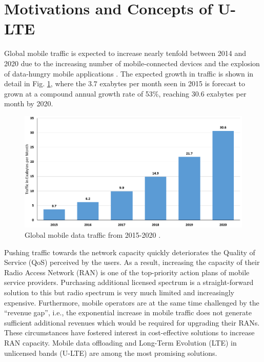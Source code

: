 \section{Motivations and Concepts of U-LTE}
\label{lte-motiv}

Global mobile traffic is expected to increase nearly tenfold between 2014 and 2020 due to the increasing number of mobile-connected devices and the explosion of data-hungry mobile applications \cite{cisco_mobile_traffic_2015}. The expected growth in traffic is shown in detail in Fig. \ref{figs:global-mobile-data-traffic-2015-2020}, where the $3.7$ exabytes per month seen in 2015 is forecast to grown at a compound annual growth rate of 53\%, reaching $30.6$ exabytes per month by 2020. 
\begin{figure}[!ht]
	\centering
	\includegraphics[width=\textwidth]{figs/global-mobile-data-traffic-2015-2020}
	\caption{Global mobile data traffic from 2015-2020 \cite{cisco_mobile_traffic_2015}.}
	\label{figs:global-mobile-data-traffic-2015-2020}
\end{figure}
Pushing traffic towards the network capacity quickly deteriorates the Quality of Service (QoS) perceived by the users. As a result, increasing the capacity of their Radio Access Network (RAN) is one of the top-priority action plans of mobile service providers. Purchasing additional licensed spectrum is a straight-forward solution to this but radio spectrum is very much limited and increasingly expensive. Furthermore, mobile operators are at the same time challenged by the ``revenue gap'', i.e., the exponential increase in mobile traffic does not generate sufficient additional revenues which would be required for upgrading their RANs. These circumstances have fostered interest in cost-effective solutions to increase RAN capacity. Mobile data offloading and Long-Term Evolution (LTE) in unlicensed bands (\mbox{U-LTE}) are among the most promising solutions.

